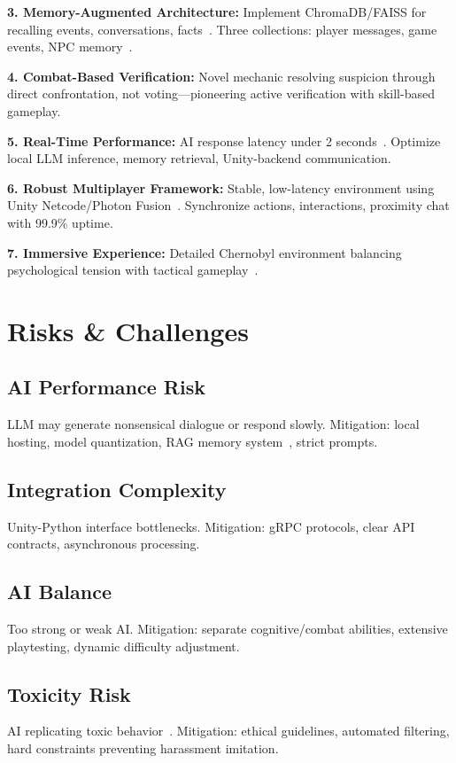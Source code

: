 \textbf{3. Memory-Augmented Architecture:} Implement ChromaDB/FAISS for recalling events, conversations, facts~\cite{liu2022,chandrasekhara2024}. Three collections: player messages, game events, NPC memory~\cite{wangw2024}.

\textbf{4. Combat-Based Verification:} Novel mechanic resolving suspicion through direct confrontation, not voting—pioneering active verification with skill-based gameplay.

\textbf{5. Real-Time Performance:} AI response latency under 2 seconds~\cite{motoo2021}. Optimize local LLM inference, memory retrieval, Unity-backend communication.

\textbf{6. Robust Multiplayer Framework:} Stable, low-latency environment using Unity Netcode/Photon Fusion~\cite{barri2016,deng2018}. Synchronize actions, interactions, proximity chat with 99.9\% uptime.

\textbf{7. Immersive Experience:} Detailed Chernobyl environment balancing psychological tension with tactical gameplay~\cite{raith2021}.

\section{Risks \& Challenges}

\subsection{AI Performance Risk}
LLM may generate nonsensical dialogue or respond slowly. Mitigation: local hosting, model quantization, RAG memory system~\cite{chen2023,muludi2023}, strict prompts.

\subsection{Integration Complexity}
Unity-Python interface bottlenecks. Mitigation: gRPC protocols, clear API contracts, asynchronous processing.

\subsection{AI Balance}
Too strong or weak AI. Mitigation: separate cognitive/combat abilities, extensive playtesting, dynamic difficulty adjustment.

\subsection{Toxicity Risk}
AI replicating toxic behavior~\cite{park2023ai}. Mitigation: ethical guidelines, automated filtering, hard constraints preventing harassment imitation.


